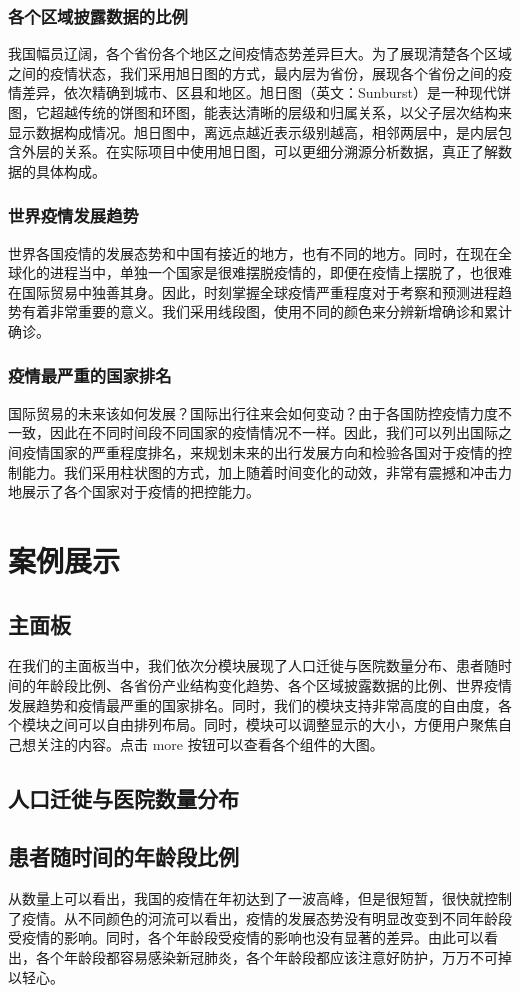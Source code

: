 \documentclass{ctexart}
\begin{document}
\subsubsection{各个区域披露数据的比例}
我国幅员辽阔，各个省份各个地区之间疫情态势差异巨大。为了展现清楚各个区域之间的疫情状态，我们采用旭日图的方式，最内层为省份，展现各个省份之间的疫情差异，依次精确到城市、区县和地区。旭日图（英文：Sunburst）是一种现代饼图，它超越传统的饼图和环图，能表达清晰的层级和归属关系，以父子层次结构来显示数据构成情况。旭日图中，离远点越近表示级别越高，相邻两层中，是内层包含外层的关系。在实际项目中使用旭日图，可以更细分溯源分析数据，真正了解数据的具体构成。
\subsubsection{世界疫情发展趋势}
世界各国疫情的发展态势和中国有接近的地方，也有不同的地方。同时，在现在全球化的进程当中，单独一个国家是很难摆脱疫情的，即便在疫情上摆脱了，也很难在国际贸易中独善其身。因此，时刻掌握全球疫情严重程度对于考察和预测进程趋势有着非常重要的意义。我们采用线段图，使用不同的颜色来分辨新增确诊和累计确诊。
\subsubsection{疫情最严重的国家排名}
国际贸易的未来该如何发展？国际出行往来会如何变动？由于各国防控疫情力度不一致，因此在不同时间段不同国家的疫情情况不一样。因此，我们可以列出国际之间疫情国家的严重程度排名，来规划未来的出行发展方向和检验各国对于疫情的控制能力。我们采用柱状图的方式，加上随着时间变化的动效，非常有震撼和冲击力地展示了各个国家对于疫情的把控能力。
\section{案例展示}
\subsection{主面板}
在我们的主面板当中，我们依次分模块展现了人口迁徙与医院数量分布、患者随时间的年龄段比例、各省份产业结构变化趋势、各个区域披露数据的比例、世界疫情发展趋势和疫情最严重的国家排名。同时，我们的模块支持非常高度的自由度，各个模块之间可以自由排列布局。同时，模块可以调整显示的大小，方便用户聚焦自己想关注的内容。点击 more 按钮可以查看各个组件的大图。
\subsection{人口迁徙与医院数量分布}

\subsection{患者随时间的年龄段比例}
从数量上可以看出，我国的疫情在年初达到了一波高峰，但是很短暂，很快就控制了疫情。从不同颜色的河流可以看出，疫情的发展态势没有明显改变到不同年龄段受疫情的影响。同时，各个年龄段受疫情的影响也没有显著的差异。由此可以看出，各个年龄段都容易感染新冠肺炎，各个年龄段都应该注意好防护，万万不可掉以轻心。
\end{document}
